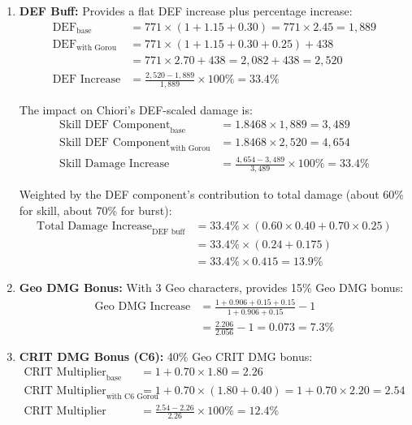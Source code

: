 \documentclass[12pt,a4paper]{article}
\begin{document}
\begin{enumerate}
    \item \textbf{DEF Buff:} Provides a flat DEF increase plus percentage increase:
    \begin{align}
    \text{DEF}_{\text{base}} &= 771 \times (1 + 1.15 + 0.30) = 771 \times 2.45 = 1,889 \\
    \text{DEF}_{\text{with Gorou}} &= 771 \times (1 + 1.15 + 0.30 + 0.25) + 438 \\
    &= 771 \times 2.70 + 438 = 2,082 + 438 = 2,520 \\
    \text{DEF Increase} &= \frac{2,520 - 1,889}{1,889} \times 100\% = 33.4\%
    \end{align}
    
    The impact on Chiori's DEF-scaled damage is:
    \begin{align}
    \text{Skill DEF Component}_{\text{base}} &= 1.8468 \times 1,889 = 3,489 \\
    \text{Skill DEF Component}_{\text{with Gorou}} &= 1.8468 \times 2,520 = 4,654 \\
    \text{Skill Damage Increase} &= \frac{4,654 - 3,489}{3,489} \times 100\% = 33.4\%
    \end{align}
    
    Weighted by the DEF component's contribution to total damage (about 60\% for skill, about 70\% for burst):
    \begin{align}
    \text{Total Damage Increase}_{\text{DEF buff}} &= 33.4\% \times (0.60 \times 0.40 + 0.70 \times 0.25) \\
    &= 33.4\% \times (0.24 + 0.175) \\
    &= 33.4\% \times 0.415 = 13.9\%
    \end{align}
    
    \item \textbf{Geo DMG Bonus:} With 3 Geo characters, provides 15\% Geo DMG bonus:
    \begin{align}
    \text{Geo DMG Increase} &= \frac{1 + 0.906 + 0.15 + 0.15}{1 + 0.906 + 0.15} - 1 \\
    &= \frac{2.206}{2.056} - 1 = 0.073 = 7.3\%
    \end{align}
    
    \item \textbf{CRIT DMG Bonus (C6):} 40\% Geo CRIT DMG bonus:
    \begin{align}
    \text{CRIT Multiplier}_{\text{base}} &= 1 + 0.70 \times 1.80 = 2.26 \\
    \text{CRIT Multiplier}_{\text{with C6 Gorou}} &= 1 + 0.70 \times (1.80 + 0.40) = 1 + 0.70 \times 2.20 = 2.54 \\
    \text{CRIT Multiplier Increase} &= \frac{2.54 - 2.26}{2.26} \times 100\% = 12.4\%
    \end{align}
\end{enumerate}
\end{document}

